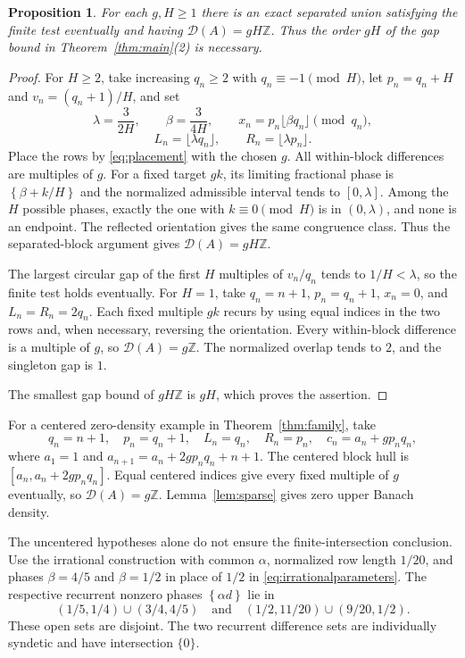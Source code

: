 \documentclass[11pt,leqno]{amsart}
\numberwithin{equation}{section}
\newtheorem{proposition}[theorem]{Proposition}
\theoremstyle{definition}
\theoremstyle{remark}
\newcommand{\Z}{\mathbb Z}
\newcommand{\D}{\mathcal D}
\newcommand{\fr}[1]{\left\{#1\right\}}
\begin{document}
\begin{proposition}\label{prop:order}
For each $g,H\ge1$ there is an exact separated union satisfying the finite test eventually and having $\D(A)=gH\Z$. Thus the order $gH$ of the gap bound in Theorem~\ref{thm:main}(2) is necessary.
\end{proposition}
\begin{proof}
For $H\ge2$, take increasing $q_n\ge2$ with $q_n\equiv-1\pmod H$, let $p_n=q_n+H$ and $v_n=(q_n+1)/H$, and set
\[
\lambda=\frac{3}{2H},\qquad \beta=\frac{3}{4H},\qquad
x_n=p_n\lfloor\beta q_n\rfloor\pmod{q_n},
\]
\[
L_n=\lfloor\lambda q_n\rfloor,
\qquad R_n=\lfloor\lambda p_n\rfloor.
\]
Place the rows by \eqref{eq:placement} with the chosen $g$. All within-block differences are multiples of $g$. For a fixed target $gk$, its limiting fractional phase is $\fr{\beta+k/H}$ and the normalized admissible interval tends to $[0,\lambda]$. Among the $H$ possible phases, exactly the one with $k\equiv0\pmod H$ is in $(0,\lambda)$, and none is an endpoint. The reflected orientation gives the same congruence class. Thus the separated-block argument gives $\D(A)=gH\Z$.

The largest circular gap of the first $H$ multiples of $v_n/q_n$ tends to $1/H<\lambda$, so the finite test holds eventually. For $H=1$, take $q_n=n+1$, $p_n=q_n+1$, $x_n=0$, and $L_n=R_n=2q_n$. Each fixed multiple $gk$ recurs by using equal indices in the two rows and, when necessary, reversing the orientation. Every within-block difference is a multiple of $g$, so $\D(A)=g\Z$. The normalized overlap tends to $2$, and the singleton gap is $1$.

The smallest gap bound of $gH\Z$ is $gH$, which proves the assertion.
\end{proof}

For a centered zero-density example in Theorem~\ref{thm:family}, take
\[
q_n=n+1,\quad p_n=q_n+1,\quad L_n=q_n,\quad R_n=p_n,
\quad c_n=a_n+gp_nq_n,
\]
where $a_1=1$ and $a_{n+1}=a_n+2gp_nq_n+n+1$. The centered block hull is $[a_n,a_n+2gp_nq_n]$. Equal centered indices give every fixed multiple of $g$ eventually, so $\D(A)=g\Z$. Lemma~\ref{lem:sparse} gives zero upper Banach density.

The uncentered hypotheses alone do not ensure the finite-intersection conclusion. Use the irrational construction with common $\alpha$, normalized row length $1/20$, and phases $\beta=4/5$ and $\beta=1/2$ in place of $1/2$ in \eqref{eq:irrationalparameters}. The respective recurrent nonzero phases $\fr{\alpha d}$ lie in
\[
(1/5,1/4)\cup(3/4,4/5)
\quad\text{and}\quad
(1/2,11/20)\cup(9/20,1/2).
\]
These open sets are disjoint. The two recurrent difference sets are individually syndetic and have intersection $\{0\}$.
\end{document}
